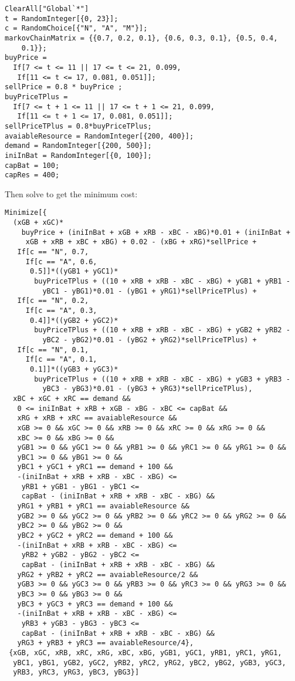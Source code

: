 {\scriptsize \begin{lstlisting}
ClearAll["Global`*"]
t = RandomInteger[{0, 23}];
c = RandomChoice[{"N", "A", "M"}];
markovChainMatrix = {{0.7, 0.2, 0.1}, {0.6, 0.3, 0.1}, {0.5, 0.4, 
    0.1}};
buyPrice = 
  If[7 <= t <= 11 || 17 <= t <= 21, 0.099, 
   If[11 <= t <= 17, 0.081, 0.051]];
sellPrice = 0.8 * buyPrice ;
buyPriceTPlus = 
  If[7 <= t + 1 <= 11 || 17 <= t + 1 <= 21, 0.099, 
   If[11 <= t + 1 <= 17, 0.081, 0.051]];
sellPriceTPlus = 0.8*buyPriceTPlus;
avaiableResource = RandomInteger[{200, 400}];
demand = RandomInteger[{200, 500}];
iniInBat = RandomInteger[{0, 100}];
capBat = 100;
capRes = 400;
\end{lstlisting}}

Then solve to get the minimum cost:
{\scriptsize \begin{lstlisting}
Minimize[{
  (xGB + xGC)*
    buyPrice + (iniInBat + xGB + xRB - xBC - xBG)*0.01 + (iniInBat + 
     xGB + xRB + xBC + xBG) + 0.02 - (xBG + xRG)*sellPrice +
   If[c == "N", 0.7, 
     If[c == "A", 0.6, 
      0.5]]*((yGB1 + yGC1)*
       buyPriceTPlus + ((10 + xRB + xRB - xBC - xBG) + yGB1 + yRB1 - 
         yBC1 - yBG1)*0.01 - (yBG1 + yRG1)*sellPriceTPlus) +
   If[c == "N", 0.2, 
     If[c == "A", 0.3, 
      0.4]]*((yGB2 + yGC2)*
       buyPriceTPlus + ((10 + xRB + xRB - xBC - xBG) + yGB2 + yRB2 - 
         yBC2 - yBG2)*0.01 - (yBG2 + yRG2)*sellPriceTPlus) +
   If[c == "N", 0.1, 
     If[c == "A", 0.1, 
      0.1]]*((yGB3 + yGC3)*
       buyPriceTPlus + ((10 + xRB + xRB - xBC - xBG) + yGB3 + yRB3 - 
         yBC3 - yBG3)*0.01 - (yBG3 + yRG3)*sellPriceTPlus),
  xBC + xGC + xRC == demand &&
   0 <= iniInBat + xRB + xGB - xBG - xBC <= capBat &&
   xRG + xRB + xRC == avaiableResource &&
   xGB >= 0 && xGC >= 0 && xRB >= 0 && xRC >= 0 && xRG >= 0 && 
   xBC >= 0 && xBG >= 0 &&
   yGB1 >= 0 && yGC1 >= 0 && yRB1 >= 0 && yRC1 >= 0 && yRG1 >= 0 && 
   yBC1 >= 0 && yBG1 >= 0 &&
   yBC1 + yGC1 + yRC1 == demand + 100 &&
   -(iniInBat + xRB + xRB - xBC - xBG) <= 
    yRB1 + yGB1 - yBG1 - yBC1 <= 
    capBat - (iniInBat + xRB + xRB - xBC - xBG) &&
   yRG1 + yRB1 + yRC1 == avaiableResource &&
   yGB2 >= 0 && yGC2 >= 0 && yRB2 >= 0 && yRC2 >= 0 && yRG2 >= 0 && 
   yBC2 >= 0 && yBG2 >= 0 &&
   yBC2 + yGC2 + yRC2 == demand + 100 &&
   -(iniInBat + xRB + xRB - xBC - xBG) <= 
    yRB2 + yGB2 - yBG2 - yBC2 <= 
    capBat - (iniInBat + xRB + xRB - xBC - xBG) &&
   yRG2 + yRB2 + yRC2 == avaiableResource/2 &&
   yGB3 >= 0 && yGC3 >= 0 && yRB3 >= 0 && yRC3 >= 0 && yRG3 >= 0 && 
   yBC3 >= 0 && yBG3 >= 0 &&
   yBC3 + yGC3 + yRC3 == demand + 100 &&
   -(iniInBat + xRB + xRB - xBC - xBG) <= 
    yRB3 + yGB3 - yBG3 - yBC3 <= 
    capBat - (iniInBat + xRB + xRB - xBC - xBG) &&
   yRG3 + yRB3 + yRC3 == avaiableResource/4},
 {xGB, xGC, xRB, xRC, xRG, xBC, xBG, yGB1, yGC1, yRB1, yRC1, yRG1, 
  yBC1, yBG1, yGB2, yGC2, yRB2, yRC2, yRG2, yBC2, yBG2, yGB3, yGC3, 
  yRB3, yRC3, yRG3, yBC3, yBG3}]
\end{lstlisting}}
